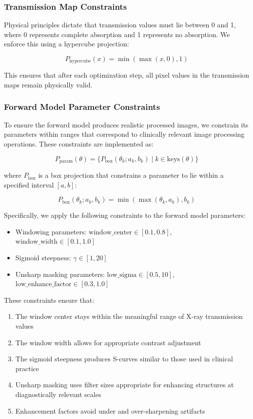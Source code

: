 \documentclass[nomenclature, english, bibtex]{kththesis}
\numberwithin{listing}{chapter}
\begin{document}
\subsubsection{Transmission Map Constraints}
Physical principles dictate that transmission values must lie between 0 and 1, where 0 represents complete absorption and 1 represents no absorption. We enforce this using a hypercube projection:

\begin{equation}
P_{\text{hypercube}}(x) = \min(\max(x, 0), 1)
\end{equation}

This ensures that after each optimization step, all pixel values in the transmission maps remain physically valid.

\subsubsection{Forward Model Parameter Constraints}
To ensure the forward model produces realistic processed images, we constrain its parameters within ranges that correspond to clinically relevant image processing operations. These constraints are implemented as:

\begin{equation}
P_{\text{param}}(\theta) = \{P_{\text{box}}(\theta_k; a_k, b_k) \mid k \in \text{keys}(\theta)\}
\end{equation}

where $P_{\text{box}}$ is a box projection that constrains a parameter to lie within a specified interval $[a, b]$:

\begin{equation}
P_{\text{box}}(\theta_k; a_k, b_k) = \min(\max(\theta_k, a_k), b_k)
\end{equation}

Specifically, we apply the following constraints to the forward model parameters:
\begin{itemize}
    \item Windowing parameters: $\text{window\_center} \in [0.1, 0.8]$, $\text{window\_width} \in [0.1, 1.0]$
    \item Sigmoid steepness: $\gamma \in [1, 20]$
    \item Unsharp masking parameters: $\text{low\_sigma} \in [0.5, 10]$, $\text{low\_enhance\_factor} \in [0.3, 1.0]$
\end{itemize}

These constraints ensure that:
\begin{enumerate}
    \item The window center stays within the meaningful range of X-ray transmission values
    \item The window width allows for appropriate contrast adjustment
    \item The sigmoid steepness produces S-curves similar to those used in clinical practice
    \item Unsharp masking uses filter sizes appropriate for enhancing structures at diagnostically relevant scales
    \item Enhancement factors avoid under and over-sharpening artifacts
\end{enumerate}
\end{document}

